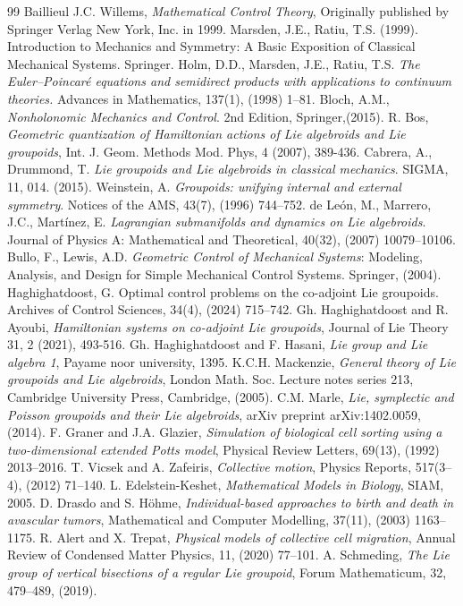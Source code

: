 \documentclass{article}
\begin{document}
\small{
\begin{thebibliography}{99}
Baillieul J.C. Willems, \textit{Mathematical Control Theory}, Originally published by Springer Verlag New York, Inc. in 1999.
 Marsden, J.E., Ratiu, T.S. (1999). Introduction to Mechanics and Symmetry: A Basic Exposition of Classical Mechanical Systems. Springer.
  Holm, D.D., Marsden, J.E.,  Ratiu, T.S. \textit{The Euler–Poincaré equations and semidirect products with applications to continuum theories. } Advances in Mathematics, 137(1), (1998) 1–81.
Bloch, A.M., \textit{ Nonholonomic Mechanics and Control}. 2nd Edition, Springer,(2015).
 R. Bos, \textit{Geometric quantization of Hamiltonian actions of Lie algebroids and Lie groupoids}, Int. J. Geom. Methods Mod. Phys, 4 (2007), 389-436.
 Cabrera, A.,  Drummond, T.  \textit{Lie groupoids and Lie algebroids in classical mechanics}. SIGMA, 11, 014. (2015).
 Weinstein, A.  \textit{Groupoids: unifying internal and external symmetry}. Notices of the AMS, 43(7), (1996) 744–752.
 de León, M., Marrero, J.C.,  Martínez, E. \textit{ Lagrangian submanifolds and dynamics on Lie algebroids}. Journal of Physics A: Mathematical and Theoretical, 40(32), (2007) 10079–10106.
 Bullo, F.,  Lewis, A.D. \textit{ Geometric Control of Mechanical Systems}: Modeling, Analysis, and Design for Simple Mechanical Control Systems. Springer, (2004).
 Haghighatdoost, G. Optimal control problems on the co-adjoint Lie groupoids. Archives of Control Sciences, 34(4), (2024) 715–742.
 Gh. Haghighatdoost and R. Ayoubi, \textit{Hamiltonian systems on co-adjoint Lie groupoids}, Journal of Lie Theory 31, 2 (2021), 493-516. 
 Gh. Haghighatdoost and F. Hasani, \textit{Lie group and Lie algebra 1}, Payame noor university, 1395.
 K.C.H. Mackenzie, \textit{General theory of Lie groupoids and Lie algebroids}, London Math. Soc. Lecture notes series 213, Cambridge University Press, Cambridge, (2005).
 C.M. Marle, \textit{Lie, symplectic and Poisson groupoids and their Lie algebroids}, arXiv preprint arXiv:1402.0059, (2014).
F. Graner and J.A. Glazier, \textit{Simulation of biological cell sorting using a two-dimensional extended Potts model}, Physical Review Letters, 69(13), (1992) 2013–2016.
 T. Vicsek and A. Zafeiris, \textit{Collective motion}, Physics Reports, 517(3–4), (2012) 71–140.
 L. Edelstein-Keshet, \textit{Mathematical Models in Biology}, SIAM, 2005.
 D. Drasdo and S. Höhme, \textit{Individual-based approaches to birth and death in avascular tumors}, Mathematical and Computer Modelling, 37(11), (2003) 1163–1175.
R. Alert and X. Trepat, \textit{Physical models of collective cell migration}, Annual Review of Condensed Matter Physics, 11, (2020) 77–101.
 A. Schmeding, \textit{The Lie group of vertical bisections of a regular Lie groupoid}, Forum Mathematicum, 32, 479--489, (2019).
\end{thebibliography}
}
\end{document}
